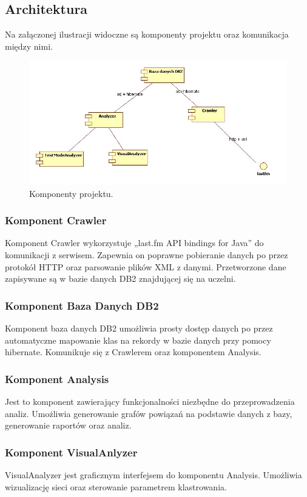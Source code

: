 \documentclass[10pt,a4paper]{article}
\begin{document}
\subsection {Architektura}
Na załączonej ilustracji widoczne są komponenty projektu oraz komunikacja między nimi.

\begin{figure}[H]
\centering
\caption{Komponenty projektu.}
\includegraphics[scale=0.65]{rys1.PNG}
\end{figure}

\subsubsection {Komponent Crawler}
	Komponent Crawler wykorzystuje „last.fm API bindings for Java” do komunikacji z serwisem. Zapewnia on poprawne pobieranie danych po przez protokół HTTP oraz parsowanie plików XML z danymi. Przetworzone dane zapisywane są w bazie danych DB2 znajdującej się na uczelni.
\subsubsection {Komponent Baza Danych DB2}
	Komponent baza danych DB2 umożliwia prosty dostęp danych po przez automatyczne mapowanie klas na rekordy w bazie danych przy pomocy hibernate. Komunikuje się z Crawlerem oraz komponentem Analysis.
\subsubsection {Komponent Analysis}
	Jest to komponent zawierający funkcjonalności niezbędne do przeprowadzenia analiz. Umożliwia generowanie grafów powiązań na podstawie danych z bazy, generowanie raportów oraz analiz.
\subsubsection {Komponent VisualAnlyzer}
	VisualAnalyzer jest graficznym interfejsem do komponentu Analysis. Umożliwia wizualizację sieci oraz sterowanie parametrem klastrowania.
\end{document}
